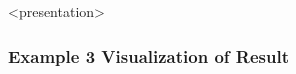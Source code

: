 \begin{frame}<presentation>
\frametitle{Example 3 Visualization of Result}
\begin{center}
\end{center}
\end{frame}

\cleardoublepage

